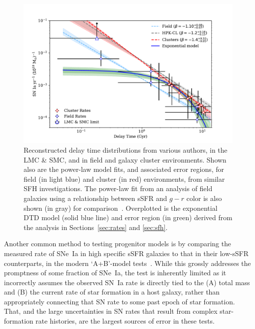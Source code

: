 \documentclass[apj, twocolumn]{aastex62}
\begin{document}
\begin{figure}[t] 
   \centering
   \includegraphics[width=6.1in]{figure_loglog_dtd.pdf}
   \caption{\footnotesize Reconstructed delay time distributions from various authors, in the LMC \& SMC, and in field and galaxy cluster environments. Shown also are the power-law model fits, and associated error regions, for field (in light blue) and cluster (in red) environments{, from similar SFH investigations. The power-law fit from an analysis of field galaxies using a relationship between sSFR and $g-r$ color is also shown (in gray) for comparison~\citep[HPK-CL,][]{Heringer:2019ws}. }Overplotted is the exponential DTD model (solid blue line) and error region (in green) derived from the analysis in Sections~\ref{sec:rates} and \ref{sec:sfh}. }
   \label{fig:logsnrate}
\end{figure}

Another common method to testing progenitor models is by comparing the measured rate of SNe~Ia in high specific sSFR galaxies to that in their low-sSFR counterparts, in the modern `A+B'-model tests~\citep{Scannapieco:2005,Smith:2012lr,Gao:2013kk,Andersen:2018dp}. While this grossly addresses the promptness of some fraction of SNe~Ia, the test is inherently limited as it incorrectly assumes the observed SN~Ia rate is directly tied to the (A) total mass and (B) the current rate of star formation in a host galaxy, rather than appropriately connecting that SN rate to some past epoch of star formation. That, and the large uncertainties in SN rates that result from complex star-formation rate histories, are the largest sources of error in these tests.
\end{document}
